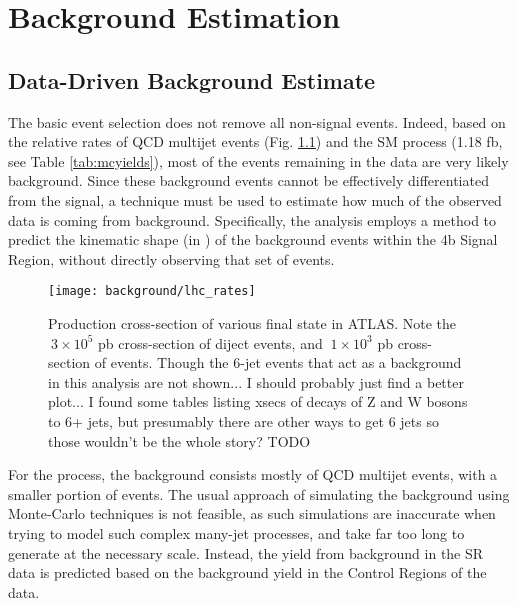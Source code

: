 \chapter{Background Estimation} \label{chapter:background}

\FloatBarrier
\section{Data-Driven Background Estimate}

    The basic event selection does not remove all non-signal events.
    Indeed, based on the relative rates of QCD multijet events (Fig. \ref{fig:lhc_rates}) and the SM \vbfhhproc process (1.18 fb, see Table \ref{tab:mcyields}),
        most of the events remaining in the data are very likely background.
    Since these background events cannot be effectively differentiated from the signal,
        a technique must be used to estimate how much of the observed data is coming from background.
    Specifically, the analysis employs a method to predict the kinematic shape (in \mhh)
        of the background events within the 4b Signal Region,
        without directly observing that set of events.

    \begin{figure}[tbh]
        \texttt{[image: background/lhc\_rates]}
        \caption{
            Production cross-section of various final state in ATLAS\cite{atlas_sm_summary}.
            Note the $~3 \times 10^5$ pb cross-section of diject events,
                and $~1 \times 10^3$ pb cross-section of \ttbar events.
            Though the 6-jet events that act as a background in this analysis are not shown...
                I should probably just find a better plot...
                I found some tables listing xsecs of decays of Z and W bosons to 6+ jets,
                but presumably there are other ways to get 6 jets so those wouldn't be the whole story? TODO
        }
        \label{fig:lhc_rates}
    \end{figure}

    For the \vbfproc process, the background consists mostly of QCD multijet events,
        with a smaller portion of \ttbar events.
    The usual approach of simulating the background using Monte-Carlo techniques is not feasible,
        as such simulations are inaccurate when trying to model such complex many-jet processes,
        and take far too long to generate at the necessary scale.
    Instead, the yield from background in the SR data is predicted based on the background yield in the Control Regions of the data.
        
